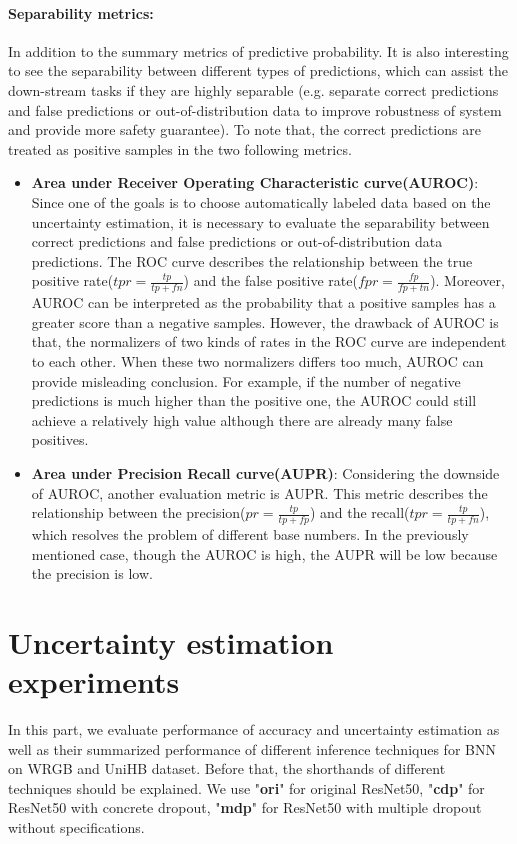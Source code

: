 \paragraph{Separability metrics:} In addition to the summary metrics of predictive probability.
It is also interesting to see the separability between different types of predictions, which can assist the down-stream tasks if they are highly separable (e.g. separate correct predictions and false predictions or out-of-distribution data to improve robustness of system and provide more safety guarantee).
To note that, the correct predictions are treated as positive samples in the two following metrics.
\begin{itemize}
	\item \textbf{Area under Receiver Operating Characteristic curve(AUROC)}: Since one of the goals is to choose automatically labeled data based on the uncertainty estimation, it is necessary to evaluate the separability between correct predictions and false predictions or out-of-distribution data predictions.
	The ROC curve describes the relationship between the true positive rate($tpr=\frac{tp}{tp+fn}$) and the false positive rate($fpr=\frac{fp}{fp+tn}$).
	Moreover, AUROC can be interpreted as the probability that a positive samples has a greater score than a negative samples.
	However, the drawback of AUROC is that, the normalizers of two kinds of rates in the ROC curve are independent to each other.
	When these two normalizers differs too much, AUROC can provide misleading conclusion.
	For example, if the number of negative predictions is much higher than the positive one, the AUROC could still achieve a relatively high value although there are already many false positives. 
	
	\item \textbf{Area under Precision Recall curve(AUPR)}: Considering the downside of AUROC, another evaluation metric is AUPR.
	This metric describes the relationship between the precision($pr = \frac{tp}{tp+fp}$) and the recall($tpr=\frac{tp}{tp+fn}$), which resolves the problem of different base numbers.
	In the previously mentioned case, though the AUROC is high, the AUPR will be low because the precision is low. 
\end{itemize}


\section{Uncertainty estimation experiments}
In this part, we evaluate performance of accuracy and uncertainty estimation as well as their summarized performance of different inference techniques for BNN on WRGB and UniHB dataset. Before that, the shorthands of different techniques should be explained. We use "\textbf{ori}" for original ResNet50, "\textbf{cdp}" for ResNet50 with concrete dropout, "\textbf{mdp}" for ResNet50 with multiple dropout without specifications.


